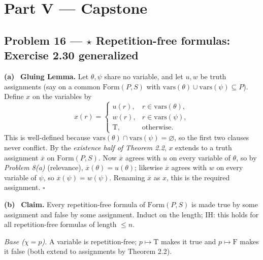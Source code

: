 \documentclass[11pt]{article}
\newcommand{\Form}{\mathrm{Form}}
\newcommand{\T}{\mathrm{T}}
\newcommand{\F}{\mathrm{F}}
\newcommand{\ext}[1]{\overline{#1}}
\newcommand{\vars}{\mathrm{vars}}
\newcommand{\solpart}[1]{\smallskip\noindent\textbf{(#1)}\ }
\newcommand{\prob}[2]{\subsection*{Problem #1 --- #2}}
\begin{document}
\section*{Part V --- Capstone}

\prob{16}{$\star$ Repetition-free formulas: Exercise 2.30 generalized}

\solpart{a} \textbf{Gluing Lemma.} Let $\theta,\psi$ share no variable, and let
$u,w$ be truth assignments (say on a common $\Form(P,S)$ with $\vars(\theta)\cup
\vars(\psi)\subseteq P$). Define $x$ on the variables by
\[
x(r)=\begin{cases}
u(r), & r\in\vars(\theta),\\
w(r), & r\in\vars(\psi),\\
\T, & \text{otherwise.}
\end{cases}
\]
This is well-defined because $\vars(\theta)\cap\vars(\psi)=\varnothing$, so the
first two clauses never conflict. By the \emph{existence half of Theorem 2.2}, $x$
extends to a truth assignment $\ext{x}$ on $\Form(P,S)$. Now $\ext{x}$ agrees with
$u$ on every variable of $\theta$, so by \emph{Problem 8(a)} (relevance),
$\ext{x}(\theta)=u(\theta)$; likewise $\ext{x}$ agrees with $w$ on every variable
of $\psi$, so $\ext{x}(\psi)=w(\psi)$. Renaming $\ext{x}$ as $x$, this is the
required assignment. \hfill$\square$

\solpart{b} \textbf{Claim.} Every repetition-free formula of $\Form(P,S)$ is made
true by some assignment and false by some assignment. Induct on the length; IH:
this holds for all repetition-free formulas of length $\le n$.

\emph{Base ($\chi=p$).} A variable is repetition-free; $p\mapsto\T$ makes it true
and $p\mapsto\F$ makes it false (both extend to assignments by Theorem 2.2).
\end{document}
